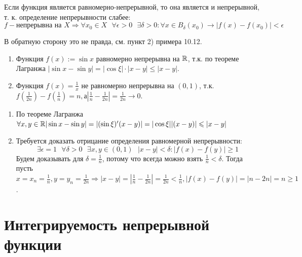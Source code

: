     \begin{mention}
    	Если функция является равномерно-непрерывной, то она является и непрерывной, т. к. определение непрерывности слабее:
    	\[ f - \text{непрерывна на } X \Rightarrow \forall x_0 \in X \text{ } \forall \epsilon > 0 \text{ } \exists \delta > 0: \forall x \in B_{\delta}(x_0) \rightarrow |f(x) - f(x_0)| < \epsilon \]
    	
    	В обратную сторону это не правда, см. пункт 2) примера 10.12.
    \end{mention}
    
    \begin{example}
    	\begin{enumerate}
    		\item Функция $f(x) := \sin{x}$ равномерно непрерывна на $\mathbb R$, т.к.
    		по теореме Лагранжа $|\sin{x} - \sin{y}| = |\cos{\xi}| \cdot |x - y| \leqslant |x - y|$.
    		\item Функция $f(x) = \frac{1}{x}$ не равномерно непрерывна на $(0, 1)$,
    		т.к. $f(\frac{1}{2n}) - f(\frac{1}{n}) = n, а |\frac{1}{n} - \frac{1}{2n}| = \frac{1}{2n} \rightarrow 0$.
    	\end{enumerate}
    \end{example}
    
    \begin{explanation}
    	\begin{enumerate}
    		\item По теореме Лагранжа $\forall x, y \in \mathbb R |\sin{x} - \sin{y}| = |(\sin{\xi})'(x - y)| = |\cos{\xi}||(x - y)| \leqslant |x - y|$
    		\item Требуется доказать отрицание определения равномерной непрерывности:
    		\[ \exists \epsilon = 1 \text{ } \forall \delta > 0 \text{ } \exists x, y \in (0, 1) \text{ } |x - y| < \delta: |f(x) - f(y)| \geqslant 1 \]
    		Будем доказывать для $\delta = \frac{1}{n}$, потому что всегда можно взять $\frac{1}{n} < \delta$. Тогда пусть $x = x_n = \frac{1}{n}, y = y_n = \frac{1}{2n} \Rightarrow |x - y| = |\frac{1}{n} - \frac{1}{2n}| = \frac{1}{2n} < \frac{1}{n}, |f(x) - f(y)| = |n - 2n| = n \geqslant 1$.
    	\end{enumerate}
    \end{explanation}
    
    \section{Интегрируемость непрерывной функции}
    
